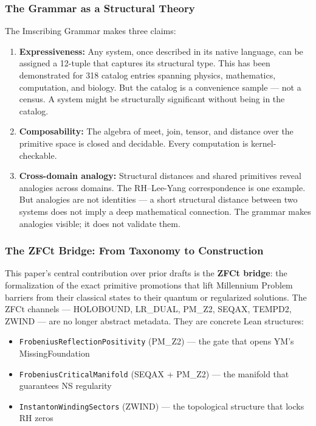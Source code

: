 \documentclass[12pt,a4paper]{article}
\begin{document}
\subsubsection{The Grammar as a Structural Theory}

The Imscribing Grammar makes three claims:

\begin{enumerate}
    \item \textbf{Expressiveness:} Any system, once described in its native language, can be assigned a 12-tuple that captures its structural type. This has been demonstrated for 318 catalog entries spanning physics, mathematics, computation, and biology. But the catalog is a convenience sample --- not a census. A system might be structurally significant without being in the catalog.
    \item \textbf{Composability:} The algebra of meet, join, tensor, and distance over the primitive space is closed and decidable. Every computation is kernel-checkable.
    \item \textbf{Cross-domain analogy:} Structural distances and shared primitives reveal analogies across domains. The RH--Lee-Yang correspondence is one example. But analogies are not identities --- a short structural distance between two systems does not imply a deep mathematical connection. The grammar makes analogies visible; it does not validate them.
\end{enumerate}

\subsubsection{The ZFCt Bridge: From Taxonomy to Construction}

This paper's central contribution over prior drafts is the \textbf{ZFCt bridge}: the formalization of the exact primitive promotions that lift Millennium Problem barriers from their classical states to their quantum or regularized solutions. The ZFCt channels --- HOLOBOUND, LR\_DUAL, PM\_Z2, SEQAX, TEMPD2, ZWIND --- are no longer abstract metadata. They are concrete Lean structures:

\begin{itemize}
    \item \texttt{FrobeniusReflectionPositivity} (PM\_Z2) --- the gate that opens YM's MissingFoundation
    \item \texttt{FrobeniusCriticalManifold} (SEQAX + PM\_Z2) --- the manifold that guarantees NS regularity
    \item \texttt{InstantonWindingSectors} (ZWIND) --- the topological structure that locks RH zeros
\end{itemize}
\end{document}
